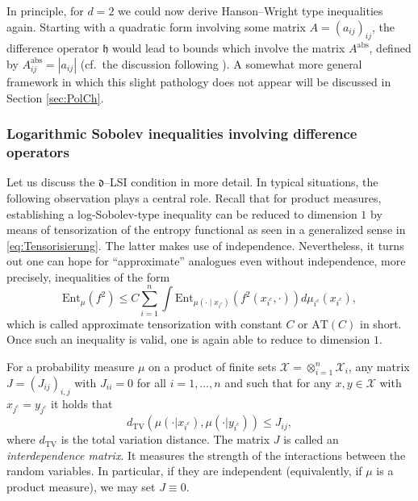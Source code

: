 \documentclass[a4paper,12pt]{amsart}
\numberwithin{equation}{section}
\theoremstyle{remark}
\def\Ent{{\mathrm{Ent}}}
\begin{document}
In principle, for $d=2$ we could now derive Hanson--Wright type inequalities again. Starting with a quadratic form involving some matrix $A=(a_{ij})_{ij}$, the difference operator $\mathfrak{h}$ would lead to bounds which involve the matrix $A^\mathrm{abs}$, defined by $A^\mathrm{abs}_{ij} = |a_{ij}|$ (cf.\ the discussion following \cite[Th.\ 1]{GSS21a}). A somewhat more general framework in which this slight pathology does not appear will be discussed in Section \ref{sec:PolCh}.

\subsubsection{Logarithmic Sobolev inequalities involving difference operators}

Let us discuss the $\mathfrak{d}$--LSI condition in more detail. In typical situations, the following observation plays a central role. Recall that for product measures, establishing a log-Sobolev-type inequality can be reduced to dimension $1$ by means of tensorization of the entropy functional as seen in a generalized sense in \eqref{eq:Tensorisierung}. The latter makes use of independence. Nevertheless, it turns out one can hope for ``approximate'' analogues even without independence, more precisely, inequalities of the form
\begin{equation}\label{eq:AT}
	\Ent_{\mu}(f^2) \le C \sum_{i = 1}^n \int \Ent_{\mu(\cdot \mid x_{i^c})}(f^2(x_{i^c}, \cdot)) d\mu_{i^c}(x_{i^c}),
\end{equation}
which is called approximate tensorization with constant $C$ or $\mathrm{AT}(C)$ in short. Once such an inequality is valid, one is again able to reduce to dimension $1$.

For a probability measure $\mu$ on a product of finite sets $\mathcal{X} = \otimes_{i = 1}^n \mathcal{X}_i$, any matrix $J = (J_{ij})_{i,j}$ with $J_{ii} = 0$ for all $i=1, \ldots, n$ and such that for any $x,y \in \mathcal{X}$ with $x_{j^c} = y_{j^c}$ it holds that
\[
d_\mathrm{TV}(\mu(\cdot|x_{i^c}), \mu(\cdot|y_{i^c})) \le J_{ij},
\]
where $d_\mathrm{TV}$ is the total variation distance. The matrix $J$ is called an \emph{interdependence matrix}. It measures the strength of the interactions between the random variables. In particular, if they are independent (equivalently, if $\mu$ is a product measure), we may set $J \equiv 0$.
\end{document}
